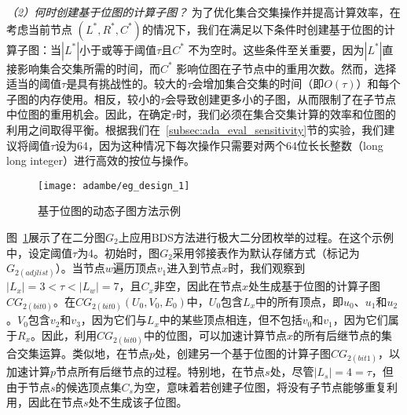 \textit{（2）何时创建基于位图的计算子图？ }为了优化集合交集操作并提高计算效率，在考虑当前节点 $(L^*, R^*, C^*)$的情况下，我们在满足以下条件时创建基于位图的计算子图：当$|L^*|$小于或等于阈值$\tau$且$C^*$ 不为空时。这些条件至关重要，因为$|L^*|$直接影响集合交集所需的时间，而$C^*$ 影响位图在子节点中的重用次数。然而，选择适当的阈值$\tau$是具有挑战性的。较大的$\tau$会增加集合交集的时间（即$O(\tau)$）和每个子图的内存使用。相反，较小的$\tau$会导致创建更多小的子图，从而限制了在子节点中位图的重用机会。因此，在确定$\tau$时，我们必须在集合交集计算的效率和位图的利用之间取得平衡。根据我们在~\ref{subsec:ada_eval_sensitivity}节的实验，我们建议将阈值$\tau$设为64，因为这种情况下每次操作只需要对两个64位长长整数（long long integer）进行高效的按位与操作。



\begin{figure} [H]
	\centering
  \vspace{0.1in}
	\texttt{[image: adambe/eg\_design\_1]}
	\caption{基于位图的动态子图方法示例}

	\label{fig:ada_design1}
\end{figure}



\begin{example}
	
	图~\ref{fig:ada_design1}展示了在二分图$G_2$上应用BDS方法进行极大二分团枚举的过程。在这个示例中，设定阈值$\tau$为4。初始时，图$G_2$采用邻接表作为默认存储方式（标记为$G_{2 (adjlist)}$）。当节点$w$遍历顶点$v_1$进入到节点$x$时，我们观察到$|L_x| = 3 < \tau < |L_w| = 7$，且$C_x$非空，因此在节点$x$处生成基于位图的计算子图$CG_{2 (bit0)}$。在$CG_{2 (bit0)}(U_0, V_0, E_0)$中，$U_0$包含$L_x$中的所有顶点，即$u_0$、$u_1$和$u_2$。$V_0$包含$v_2$和$v_3$，因为它们与$L_x$中的某些顶点相连，但不包括$v_0$和$v_1$，因为它们属于$R_x$。因此，利用$CG_{2 (bit0)}$中的位图，可以加速计算节点$x$的所有后继节点的集合交集运算。类似地，在节点$p$处，创建另一个基于位图的计算子图$CG_{2 (bit1)}$，以加速计算$p$节点所有后继节点的过程。特别地，在节点$s$处，尽管$|L_s| = 4 = \tau$，但由于节点$s$的候选顶点集$C_s$为空，意味着若创建子位图，将没有子节点能够重复利用，因此在节点$s$处不生成该子位图。
  
\end{example}

